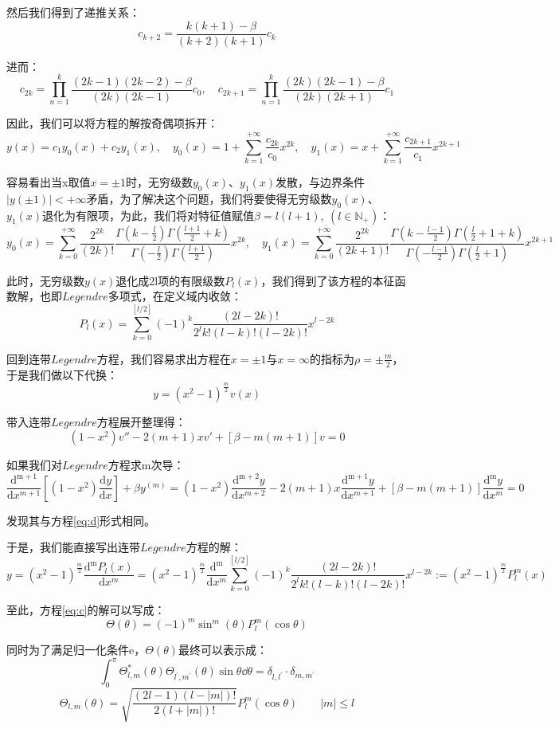 然后我们得到了递推关系：
\[c_{k+2}=\frac{k(k+1)-\beta}{(k+2)(k+1)}c_k\]

进而：
\[c_{2k}=\prod_{n=1}^{k}\frac{(2k-1)(2k-2)-\beta}{(2k)(2k-1)}c_0, \quad c_{2k+1}=\prod_{n=1}^{k}\frac{(2k)(2k-1)-\beta}{(2k)(2k+1)}c_1\]

因此，我们可以将方程的解按奇偶项拆开：
\[y(x)=c_1y_0(x)+c_2y_1(x), \quad y_0(x)=1+\sum_{k=1}^{+\infty}\frac{c_{2k}}{c_0}x^{2k}, \quad y_1(x)=x+\sum_{k=1}^{+\infty}\frac{c_{2k+1}}{c_1}x^{2k+1}\]

容易看出当x取值$x= \pm 1$时，无穷级数$y_0(x)$、$y_1(x)$发散，与边界条件$|y(\pm 1)|< +\infty$矛盾，为了解决这个问题，我们将要使得无穷级数$y_0(x)$、$y_1(x)$退化为有限项，为此，我们将对特征值赋值$\beta=l(l+1), \ (l \in \mathbb{N}_{+})$：
\[y_0(x)=\sum_{k=0}^{+\infty}\frac{2^{2k}}{(2k)!}\frac{\Gamma(k-\frac{l}{2})\Gamma(\frac{l+1}{2}+k)}{\Gamma(-\frac{l}{2})\Gamma(\frac{l+1}{2})}x^{2k}, \quad y_1(x)=\sum_{k=0}^{+\infty}\frac{2^{2k}}{(2k+1)!}\frac{\Gamma(k-\frac{l-1}{2})\Gamma(\frac{l}{2}+1+k)}{\Gamma(-\frac{l-1}{2})\Gamma(\frac{l}{2}+1)}x^{2k+1}\]

此时，无穷级数$y(x)$退化成2l项的有限级数$P_l(x)$，我们得到了该方程的本征函数解，也即$Legendre$多项式，在定义域内收敛：
\[P_l(x)=\sum_{k=0}^{[l/2]}(-1)^k \frac{(2l-2k)!}{2^l k! (l-k)!(l-2k)!}x^{l-2k}\]

回到连带$Legendre$方程，我们容易求出方程在$x= \pm 1$与$x=\infty$的指标为$\rho= \pm \frac{m}{2}$，于是我们做以下代换：
\[y=(x^2-1)^{\frac{m}{2}}v(x)\]

带入连带$Legendre$方程展开整理得：
\[(1-x^2)v''-2(m+1)xv'+[\beta-m(m+1)]v=0 \tag{d}\label{eq:d}\]

如果我们对$Legendre$方程求m次导：
\[\frac{\mathrm{d^{m+1}}}{\mathrm{d}{x^{m+1}}} \left [(1-x^2) \frac{\mathrm{d} y}{\mathrm{d}{x}} \right ]+\beta y^{(m)}=(1-x^2)\frac{\mathrm{d^{m+2}}y}{\mathrm{d}{x^{m+2}}}-2(m+1)x\frac{\mathrm{d^{m+1}}y}{\mathrm{d}{x^{m+1}}}+[\beta-m(m+1)]\frac{\mathrm{d^{m}}y}{\mathrm{d}{x^{m}}}=0\]

发现其与方程\ref{eq:d}形式相同。

于是，我们能直接写出连带$Legendre$方程的解：
\[y=(x^2-1)^{\frac{m}{2}}\frac{\mathrm{d^{m}}P_l(x)}{\mathrm{d}{x^{m}}}=(x^2-1)^{\frac{m}{2}}\frac{\mathrm{d^{m}}}{\mathrm{d}{x^{m}}}\sum_{k=0}^{[l/2]}(-1)^k \frac{(2l-2k)!}{2^l k! (l-k)!(l-2k)!}x^{l-2k}:=(x^2-1)^{\frac{m}{2}}P^m_l(x)\]

至此，方程\ref{eq:c}的解可以写成：
\[\Theta(\theta)=(-1)^m\sin^m(\theta)P^m_l(\cos\theta)\]

同时为了满足归一化条件e，$\Theta(\theta)$最终可以表示成：
\[\int_0^{\pi}\Theta_{l,m}^{*}(\theta)\Theta_{l^{'},m^{'}}(\theta)\sin\theta \dd\theta=\delta_{l,l^{'}} \cdot \delta_{m,m^{'}} \tag{e}\label{eq:e}\]
\[\Theta_{l,m}(\theta)=\sqrt{\frac{(2l-1)(l-|m|)!}{2(l+|m|)!}}P^{m}_l(\cos\theta) \qquad |m| \leqslant l\]

